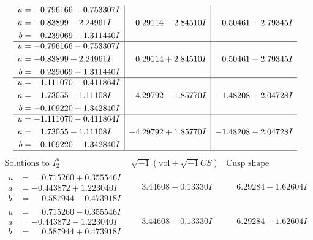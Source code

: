 \documentclass[1p]{elsarticle_modified}
\theoremstyle{definition}
\newcommand{\I}{\sqrt{-1}}
\begin{document}
$$\begin{array}{c|c|c}
\begin{aligned}
u &= -0.796166 + 0.753307 I \\
a &= -0.83899 - 2.24961 I \\
b &= \phantom{-}0.239069 - 1.311440 I\end{aligned}
 & \phantom{-}0.29114 - 2.84510 I & \phantom{-}0.50461 + 2.79345 I \\ \hline\begin{aligned}
u &= -0.796166 - 0.753307 I \\
a &= -0.83899 + 2.24961 I \\
b &= \phantom{-}0.239069 + 1.311440 I\end{aligned}
 & \phantom{-}0.29114 + 2.84510 I & \phantom{-}0.50461 - 2.79345 I \\ \hline\begin{aligned}
u &= -1.111070 + 0.411864 I \\
a &= \phantom{-}1.73055 + 1.11108 I \\
b &= -0.109220 + 1.342840 I\end{aligned}
 & -4.29792 - 1.85770 I & -1.48208 + 2.04728 I \\ \hline\begin{aligned}
u &= -1.111070 - 0.411864 I \\
a &= \phantom{-}1.73055 - 1.11108 I \\
b &= -0.109220 - 1.342840 I\end{aligned}
 & -4.29792 + 1.85770 I & -1.48208 - 2.04728 I\\
 \hline 
 \end{array}$$\newpage$$\begin{array}{c|c|c}  
\text{Solutions to }I^u_{2}& \I (\text{vol} + \sqrt{-1}CS) & \text{Cusp shape}\\
 \hline 
\begin{aligned}
u &= \phantom{-}0.715260 + 0.355546 I \\
a &= -0.443872 + 1.223040 I \\
b &= \phantom{-}0.587944 - 0.473918 I\end{aligned}
 & \phantom{-}3.44608 - 0.13330 I & \phantom{-}6.29284 - 1.62604 I \\ \hline\begin{aligned}
u &= \phantom{-}0.715260 - 0.355546 I \\
a &= -0.443872 - 1.223040 I \\
b &= \phantom{-}0.587944 + 0.473918 I\end{aligned}
 & \phantom{-}3.44608 + 0.13330 I & \phantom{-}6.29284 + 1.62604 I \\ \hline\begin{aligned}

\end{aligned}
\end{array}$$
\end{document}
